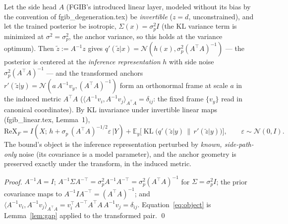 \begin{proposition}\label{prop:inverse}
Let the side head $A$ (FGIB's introduced linear layer, modeled without its bias by the
convention of fgib\_degeneration.tex) be \emph{invertible} ($z = d$, unconstrained), and
let the trained posterior be isotropic, $\Sigma(x) = \sigma_p^2 I$ (the KL variance term
is minimized at $\sigma^2 = \sigma_p^2$, the anchor variance, so this holds at the
variance optimum). Then $\tilde z := A^{-1} z$ gives
$q'(\tilde z|x) = \mathcal{N}(h(x), \sigma_p^2 (A^{\top}A)^{-1})$ --- the posterior is
centered at the \emph{inference representation} $h$ with side noise
$\sigma_p^2 (A^{\top}A)^{-1}$ --- and the transformed anchors
$r'(\tilde z|y) = \mathcal{N}(a\, A^{-1} v_y, (A^{\top}A)^{-1})$ form an orthonormal
frame at scale $a$ in the induced metric $A^{\top}A$
($\langle A^{-1}v_i, A^{-1}v_j\rangle_{A^{\top}A} = \delta_{ij}$: the fixed frame
$\{v_y\}$ read in canonical coordinates). By KL invariance under invertible linear maps
(fgib\_linear.tex, Lemma~1),
\begin{equation}
\mathrm{ReX}_F
= I(X;\, h + \sigma_p\,(A^{\top}A)^{-1/2}\varepsilon\,|Y)
+ \mathbb{E}_y\big[\operatorname{KL}\big(q'(\tilde z|y)\,\|\,r'(\tilde z|y)\big)\big],
\qquad \varepsilon \sim \mathcal{N}(0, I) .
\label{eq:object}
\end{equation}
The bound's object is the inference representation perturbed by \emph{known,
side-path-only} noise (its covariance is a model parameter), and the anchor geometry is
preserved exactly under the transform, in the induced metric.
\end{proposition}

\begin{proof}
$A^{-1}A = I$; $A^{-1}\Sigma A^{-\top} = \sigma_p^2 A^{-1}A^{-\top}
= \sigma_p^2 (A^{\top}A)^{-1}$ for $\Sigma = \sigma_p^2 I$; the prior covariance maps to
$A^{-1} I A^{-\top} = (A^{\top}A)^{-1}$; and
$\langle A^{-1}v_i, A^{-1}v_j\rangle_{A^{\top}A}
= v_i^{\top} A^{-\top} A^{\top} A\, A^{-1} v_j = \delta_{ij}$.
Equation~\eqref{eq:object} is Lemma~\ref{lem:gap} applied to the transformed pair. \hfill\qed
\end{proof}

